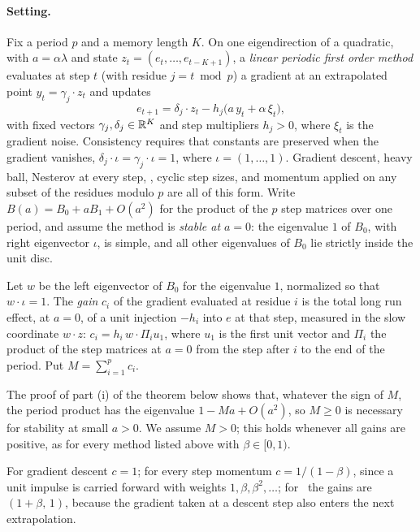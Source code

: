\paragraph{Setting.} Fix a period $p$ and a memory length $K$. On one
eigendirection of a quadratic, with $a=\alpha\lambda$ and state
$z_t=(e_t,\dots,e_{t-K+1})$, a \emph{linear periodic first order method}
evaluates at step $t$ (with residue $j=t\bmod p$) a gradient at an
extrapolated point $y_t=\gamma_j\cdot z_t$ and updates
\begin{equation}\label{eq:ch7:general}
  e_{t+1}=\delta_j\cdot z_t-h_j\bigl(a\,y_t+\alpha\,\xi_t\bigr),
\end{equation}
with fixed vectors $\gamma_j,\delta_j\in\mathbb{R}^K$ and step multipliers
$h_j>0$, where $\xi_t$ is the gradient noise. Consistency requires that
constants are preserved when the gradient vanishes, $\delta_j\cdot\iota=\gamma_j\cdot\iota=1$,
where $\iota=(1,\dots,1)$. Gradient descent, heavy ball, Nesterov at every
step, \smmdet, cyclic step sizes, and momentum applied on any subset of the
residues modulo $p$ are all of this form.
Write $B(a)=B_0+aB_1+O(a^2)$ for the product of the $p$ step matrices over one period, and assume the method is \emph{stable at $a=0$}: the eigenvalue
$1$ of $B_0$, with right eigenvector $\iota$, is simple, and all other
eigenvalues of $B_0$ lie strictly inside the unit disc.

\begin{definition}[Gains]\label{def:ch7:gains}
Let $w$ be the left eigenvector of $B_0$ for the eigenvalue $1$, normalized so
that $w\cdot\iota=1$. The \emph{gain} $c_i$ of the gradient evaluated at
residue $i$ is the total long run effect, at $a=0$, of a unit injection
$-h_i$ into $e$ at that step, measured in the slow coordinate $w\cdot z$:
$c_i=h_i\,w\cdot\Pi_iu_1$, where $u_1$ is the first unit vector and $\Pi_i$ the product of the step matrices at $a=0$ from the step after $i$ to the end of the period. Put $M=\sum_{i=1}^pc_i$.
\end{definition}

The proof of part (i) of the theorem below shows that, whatever the sign of $M$, the period product has the eigenvalue $1-Ma+O(a^2)$, so $M\ge0$ is necessary for stability at small $a>0$. We assume $M>0$; this holds whenever all gains are positive, as for every method listed above with $\beta\in[0,1)$.

For gradient descent $c=1$; for every step momentum $c=1/(1-\beta)$, since a
unit impulse is carried forward with weights $1,\beta,\beta^2,\dots$; for
\smmdet\ the gains are $(1+\beta,\,1)$, because the gradient taken at a descent
step also enters the next extrapolation.

